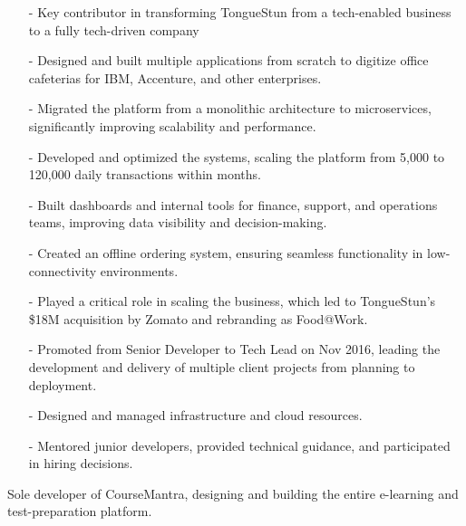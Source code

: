 \documentclass[10pt,a4paper,ragged2e,withhyper]{altacv}
\begin{document}
\begin{paracol}{2}
\divider

\begin{itemize}
    \item[-] Key contributor in transforming TongueStun from a tech-enabled business to a fully tech-driven company
    \item[-] Designed and built multiple applications from scratch to digitize office cafeterias for IBM, Accenture, and other enterprises.
    \item[-] Migrated the platform from a monolithic architecture to microservices, significantly improving scalability and performance.
    \item[-] Developed and optimized the systems, scaling the platform from 5,000 to 120,000 daily transactions within months.
    \item[-] Built dashboards and internal tools for finance, support, and operations teams, improving data visibility and decision-making.
    \item[-] Created an offline ordering system, ensuring seamless functionality in low-connectivity environments.
    \item[-] Played a critical role in scaling the business, which led to TongueStun’s \$18M acquisition by Zomato and rebranding as Food@Work.
\end{itemize}

\divider

\begin{itemize}
    \item[-] Promoted from Senior Developer to Tech Lead on Nov 2016, leading the development and delivery of multiple client projects from planning to deployment.
    \item[-] Designed and managed infrastructure and cloud resources.
    \item[-] Mentored junior developers, provided technical guidance, and participated in hiring decisions.
\end{itemize}

\divider

Sole developer of CourseMantra, designing and building the entire e-learning and test-preparation platform.


\end{paracol}
\end{document}
